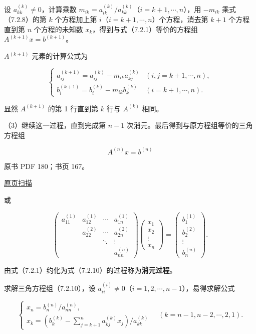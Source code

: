 \documentclass[
  10pt,
  fontset=fandol]{ctexart}
\begin{document}
设 \(a_{kk}^{(k)}\ne0\)，计算乘数 \(m_{ik}=a_{ik}^{(k)}/a_{kk}^{(k)}\)（\(i=k+1,\cdots,n\)），用 \(-m_{ik}\) 乘式（7.2.8）的第 \(k\) 个方程加上第 \(i\)（\(i=k+1,\cdots,n\)）个方程，消去第 \(k+1\) 个方程直到第 \(n\) 个方程的未知数 \(x_k\)，得到与式（7.2.1）等价的方程组 \(A^{(k+1)}x=b^{(k+1)}\)。

\(A^{(k+1)}\) 元素的计算公式为

\[
\begin{cases}
a_{ij}^{(k+1)}=a_{ij}^{(k)}-m_{ik}a_{kj}^{(k)}& (i,j=k+1,\cdots,n),\\
b_i^{(k+1)}=b_i^{(k)}-m_{ik}b_k^{(k)}& (i=k+1,\cdots,n).
\end{cases}
\tag{7.2.9}
\]

显然 \(A^{(k+1)}\) 的第 1 行直到第 \(k\) 行与 \(A^{(k)}\) 相同。

（3）继续这一过程，直到完成第 \(n-1\) 次消元。最后得到与原方程组等价的三角方程组

\[A^{(n)}x=b^{(n)}\tag{7.2.10}\]

\clearpage

原书 PDF 180；书页 167。

\href{/Users/xiangjunfeng/Desktop/数值计算专用/numerical-analysis/book/source-images/pdf-180.jpeg}{原页扫描}

或

\[
\begin{pmatrix}
a_{11}^{(1)}&a_{12}^{(1)}&\cdots&a_{1n}^{(1)}\\
&a_{22}^{(2)}&\cdots&a_{2n}^{(2)}\\
&&\ddots&\vdots\\
&&&a_{nn}^{(n)}
\end{pmatrix}
\begin{pmatrix}x_1\\x_2\\\vdots\\x_n\end{pmatrix}
=\begin{pmatrix}b_1^{(1)}\\b_2^{(2)}\\\vdots\\b_n^{(n)}\end{pmatrix}.
\]

由式（7.2.1）约化为式（7.2.10）的过程称为\textbf{消元过程}。

求解三角方程组（7.2.10），设 \(a_{ii}^{(i)}\ne0\)（\(i=1,2,\cdots,n-1\)），易得求解公式

\[
\begin{cases}
x_n=b_n^{(n)}/a_{nn}^{(n)},\\
x_k=\displaystyle\left(b_k^{(k)}-\sum_{j=k+1}^{n}a_{kj}^{(k)}x_j\right)/a_{kk}^{(k)}
\end{cases}
\quad(k=n-1,n-2,\cdots,2,1).
\tag{7.2.11}
\]
\end{document}
